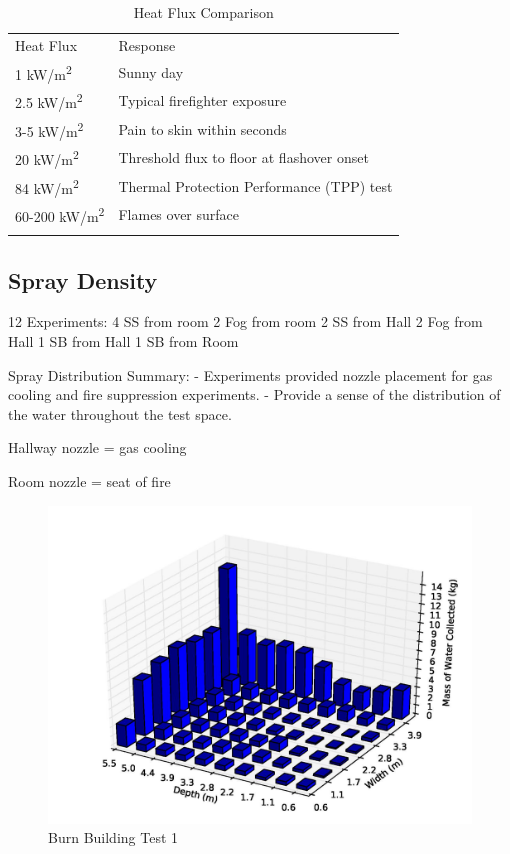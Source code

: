 \documentclass[12pt,oneside]{book}
\begin{document}
\begin{table}
	\centering
	\caption{Heat Flux Comparison}
	\begin{tabular}{ll}
		\hline\noalign{\smallskip}
		Heat Flux	  				   & Response		\\
		\noalign{\smallskip}\hline\noalign{\smallskip}
		1 kW/m\textsuperscript{2}      & Sunny day      \\
		2.5 kW/m\textsuperscript{2}    & Typical firefighter exposure     \\
		3-5 kW/m\textsuperscript{2}    & Pain to skin within seconds      \\
		20 kW/m\textsuperscript{2}     & Threshold flux to floor at flashover onset    \\
		84 kW/m\textsuperscript{2}     & Thermal Protection Performance (TPP) test    \\
		60-200 kW/m\textsuperscript{2} & Flames over surface     \\
		\noalign{\smallskip}\hline
	\end{tabular}
	\label{tab:Heat_Flux_Comparison}
\end{table}

\subsection{Spray Density}
\label{subsec:Spray_Density}

12 Experiments:
4 SS from room
2 Fog from room
2 SS from Hall
2 Fog from Hall
1 SB from Hall
1 SB from Room

Spray Distribution Summary:
- Experiments provided nozzle placement for gas cooling and fire suppression experiments.
- Provide a sense of the distribution of the water throughout the test space.

Hallway nozzle = gas cooling

Room nozzle = seat of fire

\begin{figure}[!ht]
	\includegraphics[width=6in]{../Figures/Bars/BB1}
	\caption{Burn Building Test 1}
	\label{fig:Burn_Building_Test_1}
\end{figure}
\end{document}
